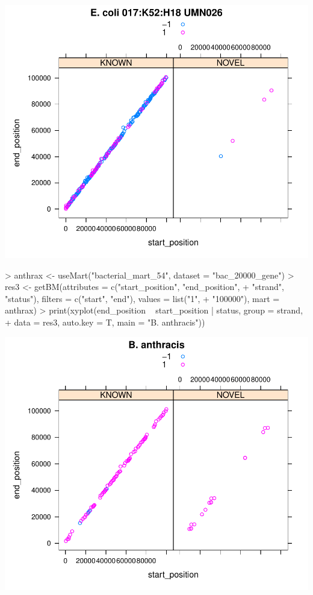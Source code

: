 \documentclass[letterpaper,12pt]{article}
\begin{document}
\begin{enumerate}
\begin{Schunk}
\end{Schunk}
\includegraphics{plots/fig-002}
\begin{Schunk}
\begin{Sinput}
> anthrax <- useMart("bacterial_mart_54", dataset = "bac_20000_gene")
> res3 <- getBM(attributes = c("start_position", "end_position", 
+     "strand", "status"), filters = c("start", "end"), values = list("1", 
+     "100000"), mart = anthrax)
> print(xyplot(end_position ~ start_position | status, group = strand, 
+     data = res3, auto.key = T, main = "B. anthracis"))
\end{Sinput}
\end{Schunk}
\includegraphics{plots/fig-003}

\end{enumerate}
\end{document}
